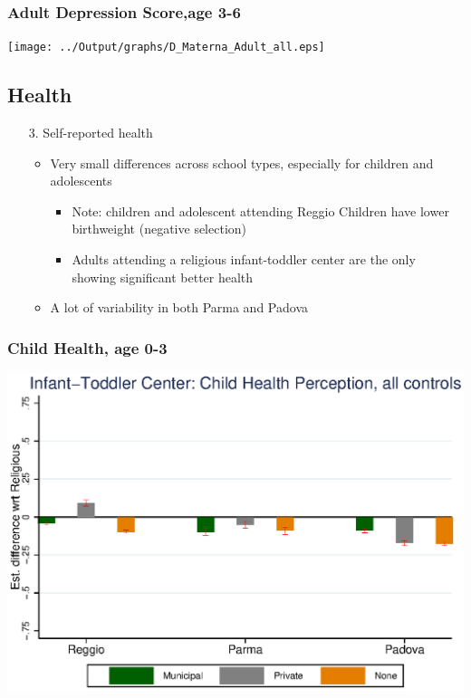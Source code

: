 \documentclass{beamer}
\begin{document}
\begin{frame}\frametitle{Adult Depression Score,age 3-6}
\center
\texttt{[image: ../Output/graphs/D\_Materna\_Adult\_all.eps]}
\end{frame}



\subsection{Health}
\begin{frame}
\begin{itemize}
	\centering
	\item[3.] Self-reported health
	\vspace{3ex}
	\begin{itemize}
		\item Very small differences across school types, especially for children and adolescents
		\begin{itemize}
			\item Note: children and adolescent attending Reggio Children have lower birthweight (negative selection)
			\item Adults attending a religious infant-toddler center are the only showing significant better health
		\end{itemize}
		\vspace{2ex}
		\item A lot of variability in both Parma and Padova
	\end{itemize}
\end{itemize}
\end{frame}

\begin{frame}\frametitle{Child Health, age 0-3}
\center
\includegraphics[scale=0.7]{../Output/graphs/CH_Asilo_Child_all.eps}
\end{frame}
\end{document}
